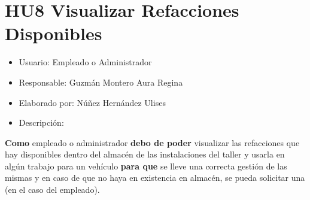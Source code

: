 \section{HU8 Visualizar Refacciones Disponibles}
\begin{itemize}
	\item Usuario: Empleado o Administrador
	\item Responsable: Guzmán Montero Aura Regina
	\item Elaborado por: Núñez Hernández Ulises
	\item Descripción:\\
\end{itemize}

\textbf{Como} empleado o administrador \textbf{debo de poder} visualizar las refacciones que hay disponibles dentro del almacén de las instalaciones del taller y usarla en algún trabajo para un vehículo \textbf{para que} se lleve una correcta gestión de las mismas y en caso de que no haya en existencia en almacén, se pueda solicitar una (en el caso del empleado). 